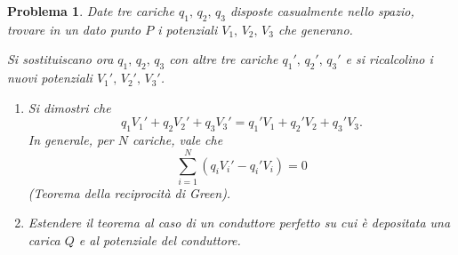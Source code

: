 \documentclass[a4paper,oneside]{article}
\newtheorem{problema}{Problema}
\begin{document}
\begin{problema}
	Date tre cariche $q_1,\,q_2,\,q_3$ disposte casualmente nello spazio, trovare
	in un dato punto $P$ i potenziali $V_1,\,V_2,\,V_3$ che generano.
	
	Si sostituiscano ora $q_1,\,q_2,\,q_3$ con altre tre cariche
	$q_1',\,q_2',\,q_3'$ e si ricalcolino i nuovi potenziali $V_1',\,V_2',\,V_3'$.
	\begin{enumerate}
		\item Si dimostri che
		$$
		q_1V_1' + q_2V_2' + q_3V_3' =
		q_1'V_1 + q_2'V_2 + q_3'V_3.
		$$
		In generale, per $N$ cariche, vale che
		$$
		\sum_{i=1}^{N} (q_iV_i' - q_i'V_i) = 0
		$$
		(Teorema della reciprocità di Green).
		\item Estendere il teorema al caso di un conduttore perfetto su cui è
		depositata una carica $Q$ e al potenziale del conduttore.
	\end{enumerate}
\end{problema}
\end{document}
